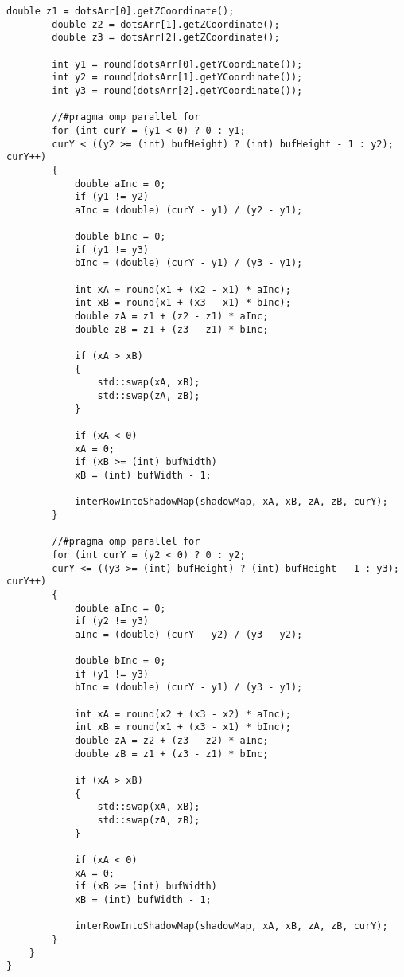 \begin{center}
\begin{lstlisting}[caption=Реализация алгоритма Z-буфера для теней]
		double z1 = dotsArr[0].getZCoordinate();
		double z2 = dotsArr[1].getZCoordinate();
		double z3 = dotsArr[2].getZCoordinate();
		
		int y1 = round(dotsArr[0].getYCoordinate());
		int y2 = round(dotsArr[1].getYCoordinate());
		int y3 = round(dotsArr[2].getYCoordinate());
		
		//#pragma omp parallel for
		for (int curY = (y1 < 0) ? 0 : y1;
		curY < ((y2 >= (int) bufHeight) ? (int) bufHeight - 1 : y2); curY++)
		{
			double aInc = 0;
			if (y1 != y2)
			aInc = (double) (curY - y1) / (y2 - y1);
			
			double bInc = 0;
			if (y1 != y3)
			bInc = (double) (curY - y1) / (y3 - y1);
			
			int xA = round(x1 + (x2 - x1) * aInc);
			int xB = round(x1 + (x3 - x1) * bInc);
			double zA = z1 + (z2 - z1) * aInc;
			double zB = z1 + (z3 - z1) * bInc;
			
			if (xA > xB)
			{
				std::swap(xA, xB);
				std::swap(zA, zB);
			}
			
			if (xA < 0)
			xA = 0;
			if (xB >= (int) bufWidth)
			xB = (int) bufWidth - 1;
			
			interRowIntoShadowMap(shadowMap, xA, xB, zA, zB, curY);
		}
		
		//#pragma omp parallel for
		for (int curY = (y2 < 0) ? 0 : y2;
		curY <= ((y3 >= (int) bufHeight) ? (int) bufHeight - 1 : y3); curY++)
		{
			double aInc = 0;
			if (y2 != y3)
			aInc = (double) (curY - y2) / (y3 - y2);
			
			double bInc = 0;
			if (y1 != y3)
			bInc = (double) (curY - y1) / (y3 - y1);
			
			int xA = round(x2 + (x3 - x2) * aInc);
			int xB = round(x1 + (x3 - x1) * bInc);
			double zA = z2 + (z3 - z2) * aInc;
			double zB = z1 + (z3 - z1) * bInc;
			
			if (xA > xB)
			{
				std::swap(xA, xB);
				std::swap(zA, zB);
			}
			
			if (xA < 0)
			xA = 0;
			if (xB >= (int) bufWidth)
			xB = (int) bufWidth - 1;
			
			interRowIntoShadowMap(shadowMap, xA, xB, zA, zB, curY);
		}
	}
}
	\end{lstlisting}
\end{center}



